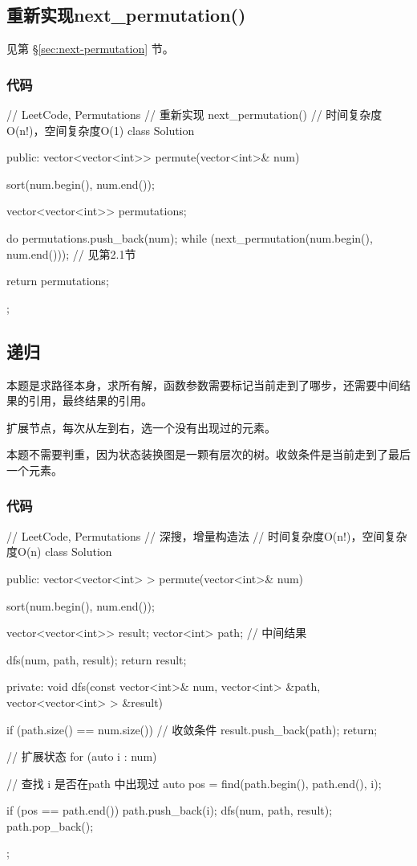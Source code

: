 \subsection{重新实现next_permutation()}
见第 \S \ref{sec:next-permutation} 节。


\subsubsection{代码}
\begin{Code}
// LeetCode, Permutations
// 重新实现 next_permutation()
// 时间复杂度O(n!)，空间复杂度O(1)
class Solution {
public:
    vector<vector<int>> permute(vector<int>& num) {
        sort(num.begin(), num.end());

        vector<vector<int>> permutations;

        do {
            permutations.push_back(num);
        } while (next_permutation(num.begin(), num.end())); // 见第2.1节

        return permutations;
    }
};
\end{Code}


\subsection{递归}
本题是求路径本身，求所有解，函数参数需要标记当前走到了哪步，还需要中间结果的引用，最终结果的引用。

扩展节点，每次从左到右，选一个没有出现过的元素。

本题不需要判重，因为状态装换图是一颗有层次的树。收敛条件是当前走到了最后一个元素。

\subsubsection{代码}
\begin{Code}
// LeetCode, Permutations
// 深搜，增量构造法
// 时间复杂度O(n!)，空间复杂度O(n)
class Solution {
public:
    vector<vector<int> > permute(vector<int>& num) {
        sort(num.begin(), num.end());

        vector<vector<int>> result;
        vector<int> path;  // 中间结果

        dfs(num, path, result);
        return result;
    }
private:
    void dfs(const vector<int>& num, vector<int> &path,
            vector<vector<int> > &result) {
        if (path.size() == num.size()) {  // 收敛条件
            result.push_back(path);
            return;
        }

        // 扩展状态
        for (auto i : num) {
            // 查找 i 是否在path 中出现过
            auto pos = find(path.begin(), path.end(), i);

            if (pos == path.end()) {
                path.push_back(i);
                dfs(num, path, result);
                path.pop_back();
            }
        }
    }
};
\end{Code}


